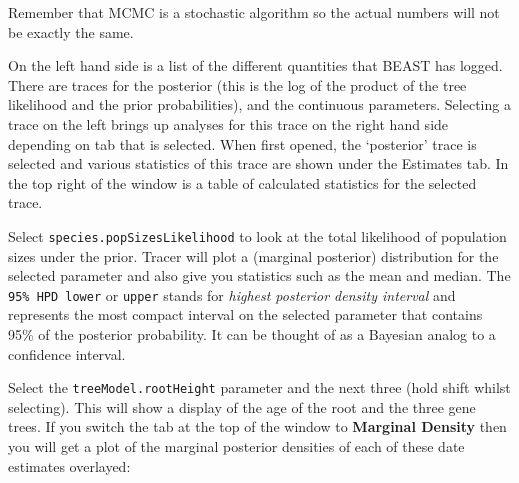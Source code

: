 \documentclass[12pt]{article}
\begin{document}
\medskip{}

Remember that MCMC is a stochastic algorithm so the actual numbers will not be exactly the same.

On the left hand side is a list of the different quantities that BEAST has logged. There are traces for the posterior (this
is the log of the product of the tree likelihood and the prior probabilities), and the continuous parameters. Selecting a trace
on the left brings up analyses for this trace on the right hand side depending on tab that is selected. When first opened, the
`posterior' trace is selected and various statistics of this trace are shown under the Estimates tab.
In the top right of the window is a table of calculated statistics for the selected trace. 

Select \texttt{species.popSizesLikelihood} to look at the total likelihood of population sizes under the prior. Tracer will plot a (marginal posterior) distribution for the selected parameter and also give you statistics such as the mean and median. The \texttt{95\% HPD lower} or \texttt {upper} stands for {\it highest posterior density interval} and represents the most compact interval on the selected parameter that contains 95\% of the posterior probability. It can be thought of as a Bayesian analog to a confidence interval. 

Select the \texttt{treeModel.rootHeight} parameter and the next three (hold shift whilst selecting). This will show a display of the
age of the root and the three gene trees. If you switch the tab at the top of the window to {\bf Marginal Density} then you will get a plot of the marginal posterior densities of each of these date estimates overlayed:

\medskip{}

\end{document}
